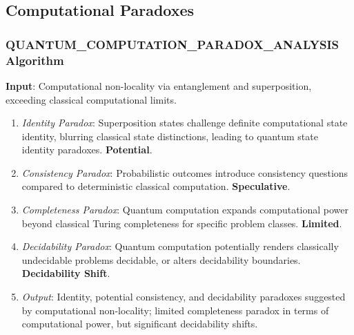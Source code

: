 \documentclass{article}
\begin{document}
	
	\subsection{Computational Paradoxes}
	
	\subsubsection{QUANTUM\_COMPUTATION\_PARADOX\_ANALYSIS Algorithm}
	\textbf{Input}: Computational non-locality via entanglement and superposition, exceeding classical computational limits.
	\begin{enumerate}
		\item \textit{Identity Paradox}: Superposition states challenge definite computational state identity, blurring classical state distinctions, leading to quantum state identity paradoxes. \textbf{Potential}.
		\item \textit{Consistency Paradox}: Probabilistic outcomes introduce consistency questions compared to deterministic classical computation. \textbf{Speculative}.
		\item \textit{Completeness Paradox}: Quantum computation expands computational power beyond classical Turing completeness for specific problem classes. \textbf{Limited}.
		\item \textit{Decidability Paradox}: Quantum computation potentially renders classically undecidable problems decidable, or alters decidability boundaries. \textbf{Decidability Shift}.
		\item \textit{Output}: Identity, potential consistency, and decidability paradoxes suggested by computational non-locality; limited completeness paradox in terms of computational power, but significant decidability shifts.
	\end{enumerate}
	
	
\end{document}
